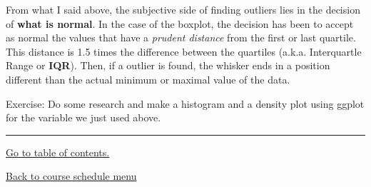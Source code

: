 \documentclass[]{article}
\begin{document}
From what I said above, the subjective side of finding outliers lies in
the decision of \textbf{what is normal}. In the case of the boxplot, the
decision has been to accept as normal the values that have a
\emph{prudent distance} from the first or last quartile. This distance
is 1.5 times the difference between the quartiles (a.k.a. Interquartle
Range or \textbf{IQR}). Then, if a outlier is found, the whisker ends in
a position different than the actual minimum or maximal value of the
data.

{ Exercise: Do some research and make a histogram and a density plot
using ggplot for the variable we just used above. }

\begin{center}\rule{0.5\linewidth}{\linethickness}\end{center}

\protect\hyperlink{part1}{Go to table of contents.}

\href{https://evansdatascience.github.io/VisualAnalytics/}{Back to
course schedule menu}
\end{document}
